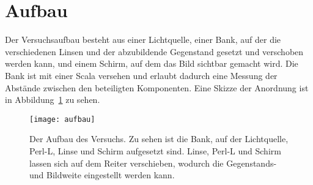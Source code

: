 
\section{Aufbau}

Der Versuchsaufbau besteht aus einer Lichtquelle, einer Bank, auf der
die verschiedenen Linsen und der abzubildende Gegenstand gesetzt und
verschoben werden kann, und einem Schirm, auf dem das Bild sichtbar
gemacht wird. Die Bank ist mit einer Scala versehen und erlaubt dadurch
eine Messung der Abstände zwischen den beteiligten Komponenten. Eine
Skizze der Anordnung ist in Abbildung~\ref{fig:aufbau} zu sehen.

\begin{figure}
  \centering
  \texttt{[image: aufbau]}
  \caption{Der Aufbau des Versuchs. Zu sehen ist die Bank, auf der
    Lichtquelle, Perl-L, Linse und Schirm aufgesetzt sind. Linse, Perl-L
    und Schirm lassen sich auf dem Reiter verschieben, wodurch die
    Gegenstands- und Bildweite eingestellt werden kann.}
  \label{fig:aufbau}
\end{figure}
